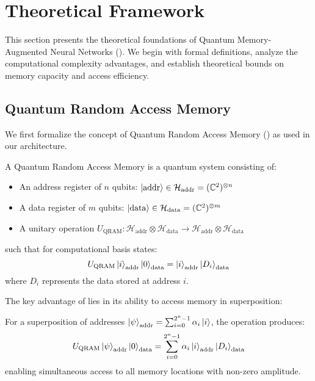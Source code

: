 \section{Theoretical Framework}
\label{sec:theory}

This section presents the theoretical foundations of Quantum Memory-Augmented Neural Networks (\qmann). We begin with formal definitions, analyze the computational complexity advantages, and establish theoretical bounds on memory capacity and access efficiency.

\subsection{Quantum Random Access Memory}

We first formalize the concept of Quantum Random Access Memory (\qram) as used in our architecture.

\begin{definition}
\label{def:qram}
A Quantum Random Access Memory is a quantum system consisting of:
\begin{itemize}
    \item An address register of $n$ qubits: $\left|\text{addr}\right\rangle \in \mathcal{H}_{\text{addr}} = (\mathbb{C}^2)^{\otimes n}$
    \item A data register of $m$ qubits: $\left|\text{data}\right\rangle \in \mathcal{H}_{\text{data}} = (\mathbb{C}^2)^{\otimes m}$
    \item A unitary operation $U_{\text{QRAM}}: \mathcal{H}_{\text{addr}} \otimes \mathcal{H}_{\text{data}} \rightarrow \mathcal{H}_{\text{addr}} \otimes \mathcal{H}_{\text{data}}$
\end{itemize}
such that for computational basis states:
$$U_{\text{QRAM}} \left|i\right\rangle_{\text{addr}} \left|0\right\rangle_{\text{data}} = \left|i\right\rangle_{\text{addr}} \left|D_i\right\rangle_{\text{data}}$$
where $D_i$ represents the data stored at address $i$.
\end{definition}

The key advantage of \qram lies in its ability to access memory in superposition:

\begin{theorem}
\label{thm:superposition_access}
For a superposition of addresses $\left|\psi\right\rangle_{\text{addr}} = \sum_{i=0}^{2^n-1} \alpha_i \left|i\right\rangle$, the \qram operation produces:
$$U_{\text{QRAM}} \left|\psi\right\rangle_{\text{addr}} \left|0\right\rangle_{\text{data}} = \sum_{i=0}^{2^n-1} \alpha_i \left|i\right\rangle_{\text{addr}} \left|D_i\right\rangle_{\text{data}}$$
enabling simultaneous access to all memory locations with non-zero amplitude.
\end{theorem}

